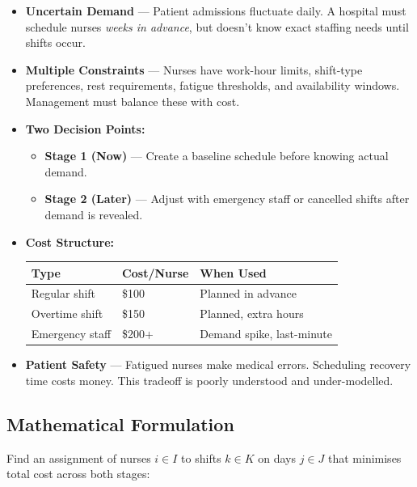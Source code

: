 \documentclass[12pt,a4paper]{article}
\begin{document}
\begin{itemize}[leftmargin=18pt, itemsep=4pt]
  \item \textbf{Uncertain Demand} — Patient admissions fluctuate daily. A hospital must schedule nurses \emph{weeks in advance}, but doesn't know exact staffing needs until shifts occur.

  \item \textbf{Multiple Constraints} — Nurses have work-hour limits, shift-type preferences, rest requirements, fatigue thresholds, and availability windows. Management must balance these with cost.

  \item \textbf{Two Decision Points:}
    \begin{itemize}[itemsep=2pt]
      \item \textbf{Stage 1 (Now)} — Create a baseline schedule before knowing actual demand.
      \item \textbf{Stage 2 (Later)} — Adjust with emergency staff or cancelled shifts after demand is revealed.
    \end{itemize}

  \item \textbf{Cost Structure:}
    \begin{center}
      \begin{tabular}{lll}
        \toprule
        \textbf{Type} & \textbf{Cost/Nurse} & \textbf{When Used} \\
        \midrule
        Regular shift   & \$100 & Planned in advance \\
        Overtime shift  & \$150 & Planned, extra hours \\
        Emergency staff & \$200+ & Demand spike, last-minute \\
        \bottomrule
      \end{tabular}
    \end{center}

  \item \textbf{Patient Safety} — Fatigued nurses make medical errors. Scheduling recovery time costs money. This tradeoff is poorly understood and under-modelled.
\end{itemize}

\subsection{Mathematical Formulation}

Find an assignment of nurses $i \in I$ to shifts $k \in K$ on days $j \in J$ that minimises total cost across both stages:
\end{document}
